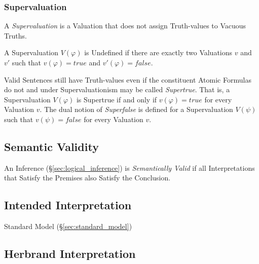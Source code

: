 \subsubsection{Supervaluation}\label{sec:supervaluation}

A \emph{Supervaluation} is a Valuation that does not assign
Truth-values to Vacuous Truths.

A Supervaluation $V(\varphi)$ is Undefined if there are exactly two
Valuations $v$ and $v'$ such that $v(\varphi) = true$ and $v'(\varphi)
= false$.

Valid Sentences still have Truth-values even if the constituent Atomic
Formulas do not and under Supervaluationism may be called
\emph{Supertrue}. That is, a Supervaluation $V(\varphi)$ is Supertrue
if and only if $v(\varphi) = true$ for every Valuation $v$. The dual
notion of \emph{Superfalse} is defined for a Supervaluation $V(\psi)$
such that $v(\psi) = false$ for every Valuation $v$.



\subsection{Semantic Validity}\label{sec:semantic_validity}

An Inference (\S\ref{sec:logical_inference}) is \emph{Semantically
  Valid} if all Interpretations that Satisfy the Premises also Satisfy
the Conclusion. \cite{gamut91}



\subsection{Intended Interpretation}\label{sec:intended_interpretation}

Standard Model (\S\ref{sec:standard_model})



\subsection{Herbrand Interpretation}\label{sec:herbrand_interpretation}



